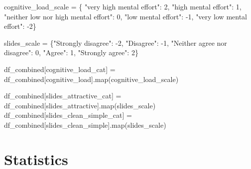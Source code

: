 \documentclass[
  letterpaper,
  DIV=11,
  numbers=noendperiod]{scrartcl}
\newenvironment{Shaded}{\begin{snugshade}}{\end{snugshade}}
\newcommand{\BuiltInTok}[1]{\textcolor[rgb]{0.00,0.23,0.31}{#1}}
\newcommand{\DecValTok}[1]{\textcolor[rgb]{0.68,0.00,0.00}{#1}}
\newcommand{\NormalTok}[1]{\textcolor[rgb]{0.00,0.23,0.31}{#1}}
\newcommand{\OperatorTok}[1]{\textcolor[rgb]{0.37,0.37,0.37}{#1}}
\newcommand{\StringTok}[1]{\textcolor[rgb]{0.13,0.47,0.30}{#1}}
\begin{document}
\begin{Shaded}
\begin{Highlighting}[]
\NormalTok{cognitive\_load\_scale }\OperatorTok{=}\NormalTok{ \{}
  \StringTok{"very high mental effort"}\NormalTok{: }\DecValTok{2}\NormalTok{,}
  \StringTok{"high mental effort"}\NormalTok{: }\DecValTok{1}\NormalTok{,  }
  \StringTok{"neither low nor high mental effort"}\NormalTok{: }\DecValTok{0}\NormalTok{, }
  \StringTok{"low mental effort"}\NormalTok{: }\OperatorTok{{-}}\DecValTok{1}\NormalTok{, }
  \StringTok{"very low mental effort"}\NormalTok{: }\OperatorTok{{-}}\DecValTok{2}\NormalTok{\}}

\NormalTok{slides\_scale }\OperatorTok{=}\NormalTok{ \{}\StringTok{"Strongly disagree"}\NormalTok{: }\OperatorTok{{-}}\DecValTok{2}\NormalTok{, }\StringTok{"Disagree"}\NormalTok{: }\OperatorTok{{-}}\DecValTok{1}\NormalTok{, }
  \StringTok{"Neither agree nor disagree"}\NormalTok{: }\DecValTok{0}\NormalTok{, }\StringTok{"Agree"}\NormalTok{: }\DecValTok{1}\NormalTok{, }\StringTok{"Strongly agree"}\NormalTok{: }\DecValTok{2}\NormalTok{\}}
  
\NormalTok{df\_combined[}\StringTok{\textquotesingle{}cognitive\_load\_cat\textquotesingle{}}\NormalTok{] }\OperatorTok{=}\NormalTok{ df\_combined[}\StringTok{\textquotesingle{}cognitive\_load\textquotesingle{}}\NormalTok{].}\BuiltInTok{map}\NormalTok{(cognitive\_load\_scale)}

\NormalTok{df\_combined[}\StringTok{\textquotesingle{}slides\_attractive\_cat\textquotesingle{}}\NormalTok{] }\OperatorTok{=}\NormalTok{ df\_combined[}\StringTok{\textquotesingle{}slides\_attractive\textquotesingle{}}\NormalTok{].}\BuiltInTok{map}\NormalTok{(slides\_scale)}
\NormalTok{df\_combined[}\StringTok{\textquotesingle{}slides\_clean\_simple\_cat\textquotesingle{}}\NormalTok{] }\OperatorTok{=}\NormalTok{ df\_combined[}\StringTok{\textquotesingle{}slides\_clean\_simple\textquotesingle{}}\NormalTok{].}\BuiltInTok{map}\NormalTok{(slides\_scale)}
\end{Highlighting}
\end{Shaded}

\section{Statistics}\label{statistics}
\end{document}
